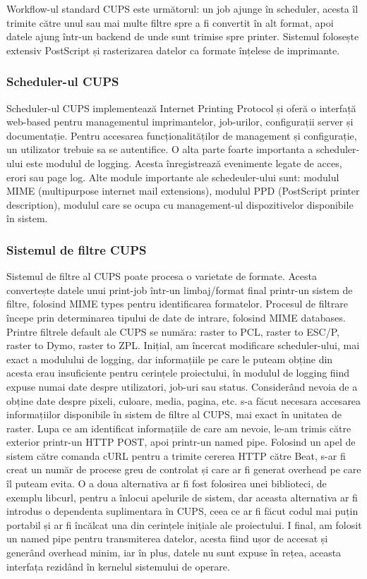 \documentclass[a4paper, 12pt, twoside]{report}
\begin{document}
Workflow-ul standard CUPS este următorul: un job ajunge în scheduler, acesta îl trimite către unul sau mai multe filtre spre a fi convertit în alt format, apoi datele ajung într-un backend de unde sunt trimise spre printer. Sistemul folosește extensiv PostScript și rasterizarea datelor ca formate înțelese de imprimante.
			\subsubsection{Scheduler-ul CUPS}
Scheduler-ul CUPS implementează Internet Printing Protocol și oferă o interfață web-based pentru managementul imprimantelor, job-urilor, configurații server și documentație. Pentru accesarea funcționalităților de management și configurație, un utilizator trebuie sa se autentifice.
O alta parte foarte importanta a scheduler-ului este modulul de logging. Acesta înregistrează evenimente legate de acces, erori sau page log.
Alte module importante ale schedeuler-ului sunt: modulul MIME (multipurpose internet mail extensions), modulul PPD (PostScript printer description), modulul care se ocupa cu management-ul dispozitivelor disponibile în sistem.


			\subsubsection{Sistemul de filtre CUPS}
Sistemul de filtre al CUPS poate procesa o varietate de formate. Acesta convertește datele unui print-job într-un limbaj/format final printr-un sistem de filtre, folosind MIME types pentru identificarea formatelor.
Procesul de filtrare începe prin determinarea tipului de date de intrare, folosind MIME databases. Printre filtrele default ale CUPS se număra: raster to PCL, raster to ESC/P, raster to Dymo, raster to ZPL.
Inițial, am încercat modificare scheduler-ului, mai exact a modulului de logging, dar informațiile pe care le puteam obține din acesta erau insuficiente pentru cerințele proiectului, în modulul de logging fiind expuse numai date despre utilizatori, job-uri sau status. Considerând nevoia de a obține date despre pixeli, culoare, media, pagina, etc. s-a făcut necesara accesarea informațiilor disponibile în sistem de filtre al CUPS, mai exact în unitatea de raster. Lupa ce am identificat informațiile de care am nevoie, le-am trimis către exterior printr-un HTTP POST, apoi printr-un named pipe. Folosind un apel de sistem către comanda cURL pentru a trimite cererea HTTP către Beat, s-ar fi creat un număr de procese greu de controlat și care ar fi generat overhead pe care îl puteam evita. O a doua alternativa ar fi fost folosirea unei biblioteci, de exemplu libcurl, pentru a înlocui apelurile de sistem, dar aceasta alternativa ar fi introdus o dependenta suplimentara în CUPS, ceea ce ar fi făcut codul mai puțin portabil și ar fi încălcat una din cerințele inițiale ale proiectului. I final, am folosit un named pipe pentru transmiterea datelor, acesta fiind ușor de accesat și generând overhead minim, iar în plus, datele nu sunt expuse în rețea, aceasta interfața rezidând în kernelul sistemului de operare.
\end{document}
